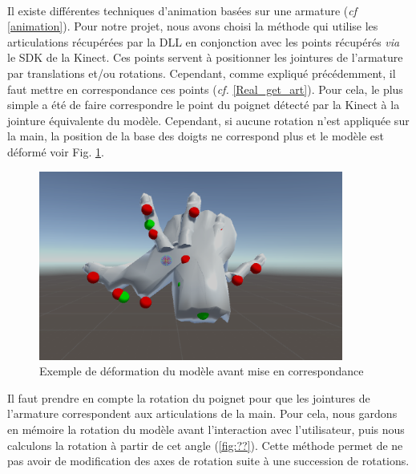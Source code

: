 \paragraph{} 
Il existe différentes techniques d'animation basées sur une armature (\textit{cf} \ref{animation}).
Pour notre projet, nous avons choisi la méthode qui utilise les articulations récupérées par la DLL en conjonction avec les points récupérés \textit{via} le SDK de la Kinect. Ces points servent à positionner les jointures de l'armature par translations et/ou rotations.
Cependant, comme expliqué précédemment, il faut mettre en correspondance ces points (\textit{cf.} \ref{Real_get_art}).
Pour cela, le plus simple a été de faire correspondre le point du poignet détecté par la Kinect à la jointure équivalente du modèle.
Cependant, si aucune rotation n'est appliquée sur la main, la position de la base des doigts ne correspond plus et le modèle est déformé voir Fig. \ref{fig:badhand}.

\begin{figure}
	\label{fig:badhand}
	\centering
	\includegraphics[width=10cm]{images/BadHand.png}
	\caption{Exemple de déformation du modèle avant mise en correspondance}	
\end{figure}

Il faut prendre en compte la rotation du poignet pour que les jointures de l'armature correspondent aux articulations de la main. 
Pour cela, nous gardons en mémoire la rotation du modèle avant l'interaction avec l'utilisateur,
puis nous calculons la rotation à partir de cet angle (\ref{fig:??}). Cette méthode permet de ne pas avoir de modification des axes de rotation suite à une succession de rotations.

%
